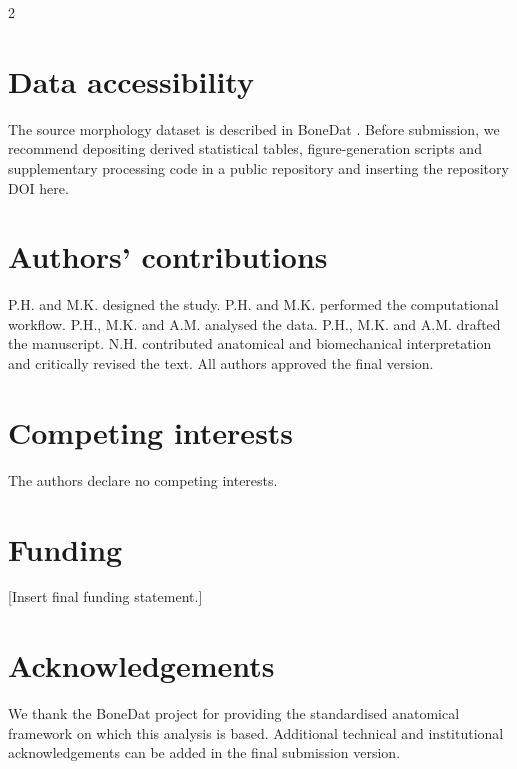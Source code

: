 \documentclass[openacc]{rsproca_new}
\begin{document}
\begin{multicols}{2}
\section*{Data accessibility}

The source morphology dataset is described in BoneDat \cite{HenysKuchar2025}. Before submission, we recommend depositing derived statistical tables, figure-generation scripts and supplementary processing code in a public repository and inserting the repository DOI here.

\section*{Authors' contributions}

P.H. and M.K. designed the study. P.H. and M.K. performed the computational workflow. P.H., M.K. and A.M. analysed the data. P.H., M.K. and A.M. drafted the manuscript. N.H. contributed anatomical and biomechanical interpretation and critically revised the text. All authors approved the final version.

\section*{Competing interests}

The authors declare no competing interests.

\section*{Funding}

[Insert final funding statement.]

\section*{Acknowledgements}

We thank the BoneDat project for providing the standardised anatomical framework on which this analysis is based. Additional technical and institutional acknowledgements can be added in the final submission version.

\end{multicols}
\end{document}
